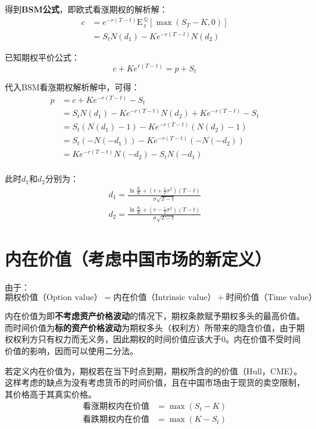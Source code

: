 \documentclass[11pt]{article}
\def\E{{\textrm{E}}\,}
\begin{document}
得到\textbf{BSM公式}，即欧式看涨期权的解析解：
\begin{align*}
    c & = e^{-r(T-t)} \E^\mathbb{Q}_t \left[ \max(S_T-K,0) \right] \\
    & = S_t N(d_1) - Ke^{-r(T-t)} N(d_2)
\end{align*}

已知期权平价公式：
\begin{equation*}
    c + K e^{r(T-t)} = p + S_t
\end{equation*}

代入BSM看涨期权解析解中，可得：
\begin{align*}
    p & = c + K e^{-r(T-t)} - S_t \\
    & = S_t N(d_1) - Ke^{-r(T-t)} N(d_2) +  Ke^{-r(T-t)} - S_t \\
    & = S_t (N(d_1) - 1) - K e^{-r(T-t)}(N(d_2)-1) \\
    & = S_t (-N(-d_1)) - K e^{-r(T-t)}(-N(-d_2)) \\
    & = K e^{-r(T-t)}N(-d_2) - S_t N(-d_1) \\
\end{align*}

此时$d_1$和$d_2$分别为：
\begin{align*}
    d_1 = \frac{\ln \frac{S_t}{K} + (r+\frac{1}{2}\sigma^2)(T-t)}{\sigma\sqrt{T-t}} \\
    d_2 = \frac{\ln \frac{S_t}{K} + (r-\frac{1}{2}\sigma^2)(T-t)}{\sigma\sqrt{T-t}}
\end{align*}

\section{内在价值（考虑中国市场的新定义）}

由于：
\begin{equation*}
    \text{期权价值（Option value）} = \text{内在价值（Intrinsic value）} + \text{时间价值（Time value）}
\end{equation*}

内在价值为即\textbf{不考虑资产价格波动}的情况下，期权条款赋予期权多头的最高价值。而时间价值为\textbf{标的资产价格波动}为期权多头（权利方）所带来的隐含价值，由于期权权利方只有权力而无义务，因此期权的时间价值应该大于0。内在价值不受时间价值的影响，因而可以使用二分法。


若定义内在价值为，期权若在当下时点到期，期权所含的的价值（Hull，CME）。这样考虑的缺点为没有考虑货币的时间价值，且在中国市场由于现货的卖空限制，其价格高于其真实价格。
\begin{align*}
    \text{看涨期权内在价值} & = \max(S_t-K) \\
    \text{看跌期权内在价值} & = \max(K-S_t)
\end{align*}
\end{document}
